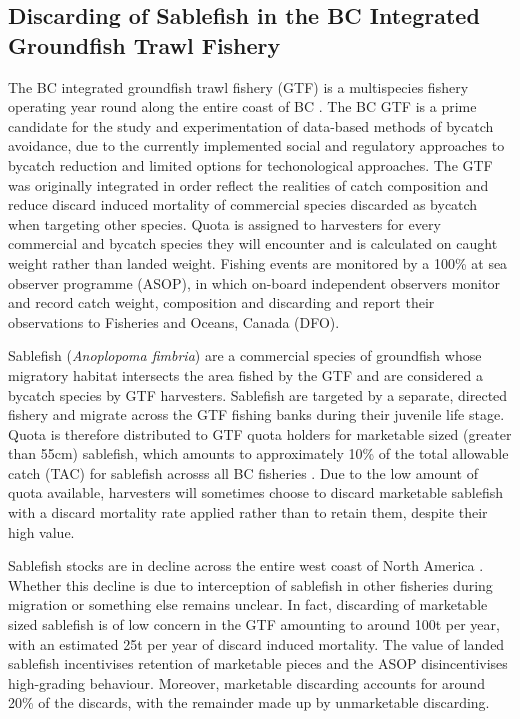 \documentclass{article}
\newcommand{\SabLatin}{{\it Anoplopoma fimbria}}
\begin{document}
\subsection{Discarding of Sablefish in the BC Integrated Groundfish Trawl Fishery} \label{sec:BCGTF}

The BC integrated groundfish trawl fishery (GTF) is a multispecies fishery operating year round along the entire coast of BC \citep{PRIFMP2010}. The BC GTF is a prime candidate for the study and experimentation of data-based methods of bycatch avoidance, due to the currently implemented social and regulatory approaches to bycatch reduction and limited options for techonological approaches. The GTF was originally integrated in order reflect the realities of catch composition and reduce discard induced mortality of commercial species discarded as bycatch when targeting other species. Quota is assigned to harvesters for every commercial and bycatch species they will encounter and is calculated on caught weight rather than landed weight. Fishing events are monitored by a 100\% at sea observer programme (ASOP), in which on-board independent observers monitor and record catch weight, composition and discarding and report their observations to Fisheries and Oceans, Canada (DFO).

Sablefish (\SabLatin) are a commercial species of groundfish whose migratory habitat intersects the area fished by the GTF and are considered a bycatch species by GTF harvesters. Sablefish are targeted by a separate, directed fishery and migrate across the GTF fishing banks during their juvenile life stage. Quota is therefore distributed to GTF quota holders for marketable sized (greater than 55cm) sablefish, which amounts to approximately 10\% of the total allowable catch (TAC) for sablefish acrosss all BC fisheries \citep{PRIFMP2010}. Due to the low amount of quota available, harvesters will sometimes choose to discard marketable sablefish with a discard mortality rate applied rather than to retain them, despite their high value.

Sablefish stocks are in decline across the entire west coast of North America \citep{hanselman2009assessment,stewart2011status}. Whether this decline is due to interception of sablefish in other fisheries during migration or something else remains unclear. In fact, discarding of marketable sized sablefish is of low concern in the GTF amounting to around 100t per year, with an estimated 25t per year of discard induced mortality. The value of landed sablefish incentivises retention of marketable pieces and the ASOP disincentivises high-grading behaviour. Moreover, marketable discarding accounts for around 20\% of the discards, with the remainder made up by unmarketable discarding.
\end{document}
